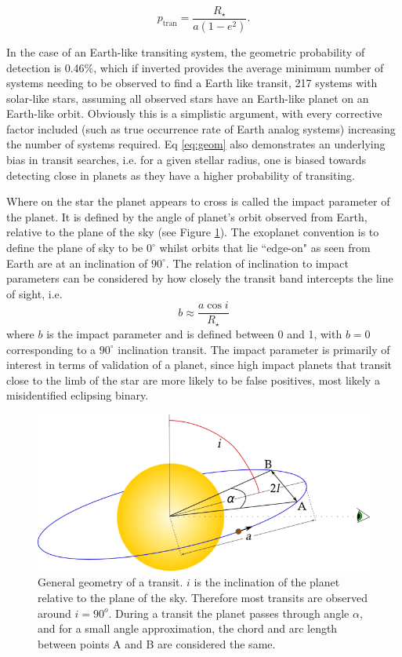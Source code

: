 \begin{equation}
p_{\textrm{tran}}=\frac{R_{\star}}{a(1-e^{2})}.
\label{eq:geom_ecc}
\end{equation}

In the case of an Earth-like transiting system, the geometric probability of detection is 0.46\%, which if inverted provides the average minimum number of systems needing to be observed to find a Earth like transit, 217 systems with solar-like stars, assuming all observed stars have an Earth-like planet on an Earth-like orbit. Obviously this is a simplistic argument, with every corrective factor included (such as true occurrence rate of Earth analog systems) increasing the number of systems required. Eq \ref{eq:geom} also demonstrates an underlying bias in transit searches, i.e. for a given stellar radius, one is biased towards detecting close in planets as they have a higher probability of transiting.

Where on the star the planet appears to cross is called the impact parameter of the planet. It is defined by the angle of planet's orbit observed from Earth, relative to the plane of the sky (see Figure \ref{fig:trandiag}). The exoplanet convention is to define the plane of sky to be $0^\circ$ whilst orbits that lie ``edge-on" as seen from Earth are at an inclination of $90^\circ$. The relation of inclination to impact parameters can be considered by how closely the transit band intercepts the line of sight, i.e. 
\begin{equation}
b\approx\frac{a\cos{i}}{R_{\star}}
\label{eq:impact}
\end{equation}
where $b$ is the impact parameter and is defined between 0 and 1, with $b=0$ corresponding to a $90^\circ$ inclination transit. The impact parameter is primarily of interest in terms of validation of a planet, since high impact planets that transit close to the limb of the star are more likely to be false positives, most likely a misidentified eclipsing binary. 

\begin{figure}[H]
\centering
	\includegraphics[width=0.7\columnwidth]{general_transit}
    \caption{General geometry of a transit. $i$ is the inclination of the planet relative to the plane of the sky. Therefore most transits are observed around $i=90^o$. During a transit the planet passes through angle $\alpha$, and for a small angle approximation, the chord and arc length between points A and B are considered the same.}
    \label{fig:trandiag}
\end{figure}

